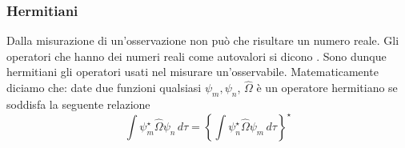 \subsubsection{Hermitiani}
Dalla misurazione di un'osservazione non può che risultare un numero reale. Gli operatori che hanno dei numeri reali come autovalori si dicono . Sono dunque hermitiani gli operatori usati nel misurare un'osservabile. Matematicamente diciamo che: date due funzioni qualsiasi $\psi_m, \psi_n$, $\hat{\Omega}$ è un operatore hermitiano se soddisfa la seguente relazione
$$\int \psi_m^{\star} \hat{\Omega} \psi_n\, d\tau = \left \{ \int \psi_n^{\star} \hat{\Omega} \psi_m\, d\tau \right \}^{\star}$$
